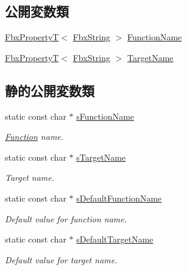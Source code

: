 \subsection*{公開変数類}
\begin{DoxyCompactItemize}
\item 
\hyperlink{class_fbx_property_t}{Fbx\+PropertyT}$<$ \hyperlink{class_fbx_string}{Fbx\+String} $>$ \hyperlink{class_fbx_binding_operator_a2dba5cfe05b72b6a46b2195872a93005}{Function\+Name}
\item 
\hyperlink{class_fbx_property_t}{Fbx\+PropertyT}$<$ \hyperlink{class_fbx_string}{Fbx\+String} $>$ \hyperlink{class_fbx_binding_operator_a6c1e84a9019ff0fa80424439fa745ee1}{Target\+Name}
\end{DoxyCompactItemize}
\subsection*{静的公開変数類}
\begin{DoxyCompactItemize}
\item 
static const char $\ast$ \hyperlink{class_fbx_binding_operator_ac905ce728f7bfb5bd7becf78af8a5c4d}{s\+Function\+Name}
\begin{DoxyCompactList}\small\item\em \hyperlink{class_fbx_binding_operator_1_1_function}{Function} name. \end{DoxyCompactList}\item 
static const char $\ast$ \hyperlink{class_fbx_binding_operator_ac53f7653f20364486e319b64b275ed4b}{s\+Target\+Name}
\begin{DoxyCompactList}\small\item\em Target name. \end{DoxyCompactList}\item 
static const char $\ast$ \hyperlink{class_fbx_binding_operator_aea467026528b679f7a8edc9862895f63}{s\+Default\+Function\+Name}
\begin{DoxyCompactList}\small\item\em Default value for function name. \end{DoxyCompactList}\item 
static const char $\ast$ \hyperlink{class_fbx_binding_operator_adba0167e90625ae94b159146b5e13b13}{s\+Default\+Target\+Name}
\begin{DoxyCompactList}\small\item\em Default value for target name. \end{DoxyCompactList}\end{DoxyCompactItemize}
